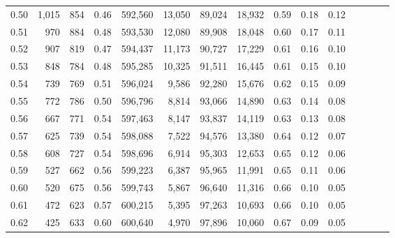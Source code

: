\begin{tabular}{rrrcrrrrrrrrrrr}
0.50 &   1,015 &    854 &                                       0.46 &  592,560 &   13,050 &   89,024 &   18,932 &  0.59 &  0.18 &                         0.12 \\
0.51 &     970 &    884 &                                       0.48 &  593,530 &   12,080 &   89,908 &   18,048 &  0.60 &  0.17 &                         0.11 \\
0.52 &     907 &    819 &                                       0.47 &  594,437 &   11,173 &   90,727 &   17,229 &  0.61 &  0.16 &                         0.10 \\
0.53 &     848 &    784 &                                       0.48 &  595,285 &   10,325 &   91,511 &   16,445 &  0.61 &  0.15 &                         0.10 \\
0.54 &     739 &    769 &                                       0.51 &  596,024 &    9,586 &   92,280 &   15,676 &  0.62 &  0.15 &                         0.09 \\
0.55 &     772 &    786 &                                       0.50 &  596,796 &    8,814 &   93,066 &   14,890 &  0.63 &  0.14 &                         0.08 \\
0.56 &     667 &    771 &                                       0.54 &  597,463 &    8,147 &   93,837 &   14,119 &  0.63 &  0.13 &                         0.08 \\
0.57 &     625 &    739 &                                       0.54 &  598,088 &    7,522 &   94,576 &   13,380 &  0.64 &  0.12 &                         0.07 \\
0.58 &     608 &    727 &                                       0.54 &  598,696 &    6,914 &   95,303 &   12,653 &  0.65 &  0.12 &                         0.06 \\
0.59 &     527 &    662 &                                       0.56 &  599,223 &    6,387 &   95,965 &   11,991 &  0.65 &  0.11 &                         0.06 \\
0.60 &     520 &    675 &                                       0.56 &  599,743 &    5,867 &   96,640 &   11,316 &  0.66 &  0.10 &                         0.05 \\
0.61 &     472 &    623 &                                       0.57 &  600,215 &    5,395 &   97,263 &   10,693 &  0.66 &  0.10 &                         0.05 \\
0.62 &     425 &    633 &                                       0.60 &  600,640 &    4,970 &   97,896 &   10,060 &  0.67 &  0.09 &                         0.05 \\

\end{tabular}
